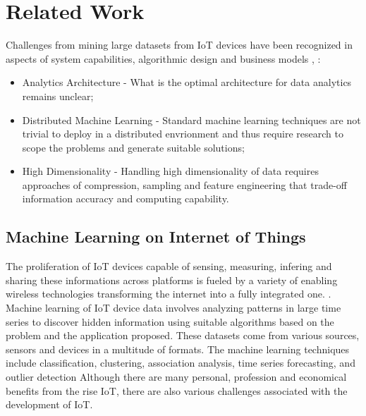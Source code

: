 \chapter{Related Work}

Challenges from mining large datasets from IoT devices have been recognized in aspects of system capabilities, algorithmic design and business models \cite{mr2017data}, \cite{verleysen2005curse} :

\begin{itemize}
	\item Analytics Architecture - What is the optimal architecture for data analytics remains unclear; 
	\item Distributed Machine Learning - Standard machine learning techniques are not trivial to deploy in a distributed envrionment and thus require research 
	to scope the problems and generate suitable solutions; 
	\item High Dimensionality - Handling high dimensionality of data requires approaches of compression, sampling and feature engineering that trade-off information accuracy and computing capability.  	
\end{itemize}

\section{Machine Learning on Internet of Things}
The proliferation of IoT devices capable of sensing, measuring, infering and sharing these informations across platforms is fueled by a variety of enabling wireless technologies transforming the internet into a fully integrated one. \cite{gubbi2013internet}. 
Machine learning of IoT device data involves analyzing patterns in large time series to discover hidden information using suitable algorithms based on the problem and the application proposed. \cite{alsheikh2014machine} 
\cite{khan2012future} These datasets come from various sources, sensors and devices in a multitude of formats. The machine learning  techniques include classification, clustering,
association analysis, time series forecasting, and outlier detection \cite{mr2017data}
Although there are many personal, profession and economical benefits from the rise IoT, there are also various challenges associated with the development of IoT. \cite{chen2012challenges} \cite{bandyopadhyay2011internet}


